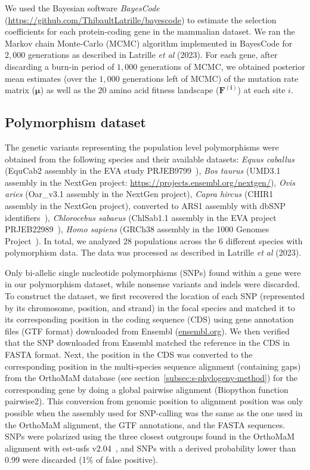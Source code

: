\documentclass[12pt]{article}
\newcommand{\UniDimArray}[1]{\bm{#1}}
\begin{document}
    We used the Bayesian software \textit{BayesCode} (\url{https://github.com/ThibaultLatrille/bayescode}) to estimate the selection coefficients for each protein-coding gene in the mammalian dataset.
    We ran the Markov chain Monte-Carlo (MCMC) algorithm implemented in BayesCode for $2,000$ generations as described in Latrille \textit{et al} (2023)\cite{latrille_genes_2023}.
    For each gene, after discarding a burn-in period of $1,000$ generations of MCMC, we obtained posterior mean estimates (over the $1,000$ generations left of MCMC) of the mutation rate matrix ($\UniDimArray{\mu}$) as well as the $20$ amino acid fitness landscape ($\UniDimArray{F^{(i)}}$) at each site $i$.

    \subsection{Polymorphism dataset}
    \label{subsec:polymorphism-dataset}

    The genetic variants representing the population level polymorphisms were obtained from the following species and their available datasets: \textit{Equus caballus} (EquCab2 assembly in the EVA study PRJEB9799~\cite{alabri_whole_2020}), \textit{Bos taurus} (UMD3.1 assembly in the NextGen project: \url{https://projects.ensembl.org/nextgen/}), \textit{Ovis aries} (Oar\_v3.1 assembly in the NextGen project), \textit{Capra hircus} (CHIR1 assembly in the NextGen project), converted to ARS1 assembly with dbSNP identifiers~\cite{sherry_dbsnp_2001}), \textit{Chlorocebus sabaeus} (ChlSab1.1 assembly in the EVA project PRJEB22989~\cite{svardal_ancient_2017}), \textit{Homo sapiens} (GRCh38 assembly in the 1000 Genomes Project~\cite{zheng-bradley_alignment_2017}).
    In total, we analyzed 28 populations across the 6 different species with polymorphism data.
    The data was processed as described in Latrille \textit{et al} (2023)\cite{latrille_genes_2023}.

    Only bi-allelic single nucleotide polymorphisms (SNPs) found within a gene were in our polymorphism dataset, while nonsense variants and indels were discarded.
    To construct the dataset, we first recovered the location of each SNP (represented by its chromosome, position, and strand) in the focal species and matched it to its corresponding position in the coding sequence (CDS) using gene annotation files (GTF format) downloaded from Ensembl (\url{ensembl.org}).
    We then verified that the SNP downloaded from Ensembl matched the reference in the CDS in FASTA format.
    Next, the position in the CDS was converted to the corresponding position in the multi-species sequence alignment (containing gaps) from the OrthoMaM database (see section~\ref{subsec:s-phylogeny-method}) for the corresponding gene by doing a global pairwise alignment (Biopython function pairwise2).
    This conversion from genomic position to alignment position was only possible when the assembly used for SNP-calling was the same as the one used in the OrthoMaM alignment, the GTF annotations, and the FASTA sequences.
    SNPs were polarized using the three closest outgroups found in the OrthoMaM alignment with est-usfs v2.04~\cite{keightley_inferring_2018}, and SNPs with a derived probability lower than 0.99 were discarded (1\% of false positive).
\end{document}
